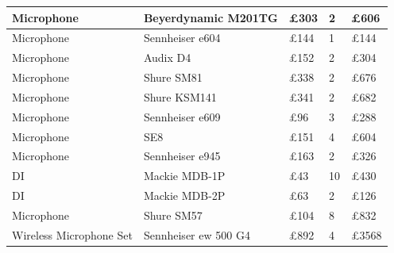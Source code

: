 \begin{longtable}[H]{|p{3cm}|p{4cm}|p{2cm}|p{3cm}|p{2cm}|}
\rowcolor[HTML]{EFEFEF} 
\cellcolor[HTML]{EFEFEF}Microphone & Beyerdynamic M201TG                & £303                          & 2                                  & £606   \\ \hline
\rowcolor[HTML]{EFEFEF} 
\cellcolor[HTML]{EFEFEF}Microphone & Sennheiser e604                    & £144                          & 1                                  & £144   \\ \hline
\rowcolor[HTML]{EFEFEF} 
\cellcolor[HTML]{EFEFEF}Microphone & Audix D4                           & £152                          & 2                                  & £304   \\ \hline
\rowcolor[HTML]{EFEFEF} 
\cellcolor[HTML]{EFEFEF}Microphone & Shure SM81                         & £338                          & 2                                  & £676   \\ \hline
\rowcolor[HTML]{EFEFEF} 
\cellcolor[HTML]{EFEFEF}Microphone & Shure KSM141                       & £341                          & 2                                  & £682   \\ \hline
\rowcolor[HTML]{EFEFEF} 
\cellcolor[HTML]{EFEFEF}Microphone & Sennheiser e609                    & £96                           & 3                                  & £288   \\ \hline
\rowcolor[HTML]{EFEFEF} 
\cellcolor[HTML]{EFEFEF}Microphone & SE8                                & £151                          & 4                                  & £604   \\ \hline
\rowcolor[HTML]{EFEFEF} 
\cellcolor[HTML]{EFEFEF}Microphone & Sennheiser e945                    & £163                          & 2                                  & £326   \\ \hline
\rowcolor[HTML]{EFEFEF} 
\cellcolor[HTML]{EFEFEF}DI         & Mackie MDB-1P                      & £43                           & 10                                 & £430   \\ \hline
\rowcolor[HTML]{EFEFEF} 
\cellcolor[HTML]{EFEFEF}DI         & Mackie MDB-2P                      & £63                           & 2                                  & £126   \\ \hline
\rowcolor[HTML]{EFEFEF} 
Microphone                         & Shure SM57                         & £104                          & 8                                  & £832   \\ \hline
Wireless Microphone Set            & Sennheiser ew 500 G4               & £892                          & 4                                  & £3568  \\ \hline

\end{longtable}
